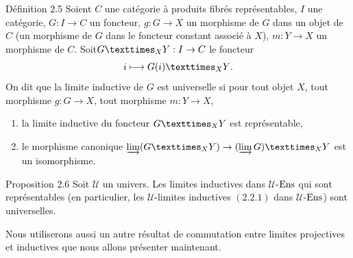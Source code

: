 \documentclass[10pt]{../fichiers-configuration-latex/smfart}
\begin{document}
\setcounter{subsection}{5}
\begin{enonce*}{Définition 2.5}
Soient $C$ une catégorie à produits fibrés représentables, $I$ une
catégorie, $G:I\rightarrow C$ un foncteur, $g:G\rightarrow X$ un
morphisme de $G$ dans un objet de $C$ (\ie un morphisme de $G$ dans
le foncteur constant associé à $X$), $m:Y\rightarrow X$ un morphisme
de $C$. Soit\pageoriginale $\fprod{G}{Y}{X}:I\rightarrow C$ le
foncteur
$$
i\longmapsto \fprod{G(i)}{Y}{X} {\quoi}.
$$
On dit que la limite inductive de $G$ est universelle si pour tout
objet $X$, tout morphisme $g:G\rightarrow X$, tout morphisme
$m:Y\rightarrow X$,
\begin{enumerate}
\item[a)] la limite inductive du foncteur $\fprod{G}{Y}{X}$ est
  représentable,

\item[b)] le morphisme canonique $\varinjlim (\fprod{G}{Y}{X}
  )\rightarrow \fprod{(\varinjlim G)}{Y}{X}$ est un isomorphisme.
\end{enumerate}
\end{enonce*}

\begin{enonce*}{Proposition 2.6}
Soit $𝒰$ un univers. Les limites inductives dans
$𝒰$-$\operatorname{Ens}$ qui sont représentables (en particulier, les
$𝒰$-limites inductives $(2.2.1)$ dans $𝒰$-$\operatorname{Ens}$) %
sont universelles.
\end{enonce*}
Nous utiliserons aussi un autre résultat de commutation entre
limites projectives et inductives que nous allons présenter
maintenant.
\end{document}

